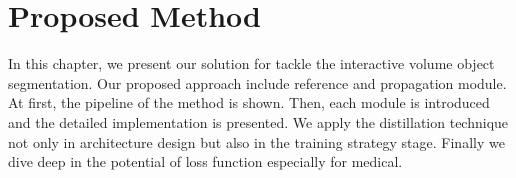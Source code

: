 \chapter{Proposed Method}
\label{chap-method}
In this chapter, we present our solution for tackle the interactive volume object segmentation. Our proposed approach include reference and propagation module. At first, the pipeline of the method is shown. Then, each module is introduced and the detailed implementation is presented. We apply the distillation technique not only in architecture design but also in the training strategy stage. Finally we dive deep in the potential of loss function especially for medical.









% 
% 
% 
% 
% 